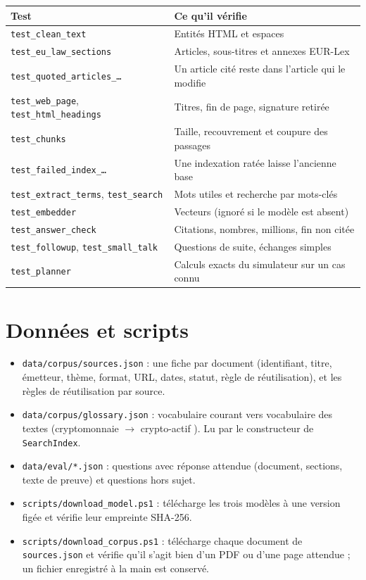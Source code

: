 \documentclass[11pt,a4paper]{article}
\newcommand{\fichier}[1]{\texttt{#1}}
\begin{document}
\begin{center}
\small
\begin{tabularx}{\linewidth}{@{}l X@{}}
\toprule
Test & Ce qu'il vérifie \\
\midrule
\texttt{test\_clean\_text} & Entités HTML et espaces \\
\texttt{test\_eu\_law\_sections} & Articles, sous-titres et annexes EUR-Lex \\
\texttt{test\_quoted\_articles\_\dots} & Un article cité reste dans l'article qui le modifie \\
\texttt{test\_web\_page}, \texttt{test\_html\_headings} & Titres, fin de page, signature retirée \\
\texttt{test\_chunks} & Taille, recouvrement et coupure des passages \\
\texttt{test\_failed\_index\_\dots} & Une indexation ratée laisse l'ancienne base \\
\texttt{test\_extract\_terms}, \texttt{test\_search} & Mots utiles et recherche par mots-clés \\
\texttt{test\_embedder} & Vecteurs (ignoré si le modèle est absent) \\
\texttt{test\_answer\_check} & Citations, nombres, millions, fin non citée \\
\texttt{test\_followup}, \texttt{test\_small\_talk} & Questions de suite, échanges simples \\
\texttt{test\_planner} & Calculs exacts du simulateur sur un cas connu \\
\bottomrule
\end{tabularx}
\end{center}

\section{Données et scripts}

\begin{itemize}
  \item \fichier{data/corpus/sources.json} : une fiche par document (identifiant, titre, émetteur, thème, format, URL, dates, statut, règle de réutilisation), et les règles de réutilisation par source.
  \item \fichier{data/corpus/glossary.json} : vocabulaire courant vers vocabulaire des textes (\og cryptomonnaie \fg{} \(\rightarrow\) \og crypto-actif \fg). Lu par le constructeur de \texttt{SearchIndex}.
  \item \fichier{data/eval/*.json} : questions avec réponse attendue (document, sections, texte de preuve) et questions hors sujet.
  \item \fichier{scripts/download\_model.ps1} : télécharge les trois modèles à une version figée et vérifie leur empreinte SHA-256.
  \item \fichier{scripts/download\_corpus.ps1} : télécharge chaque document de \fichier{sources.json} et vérifie qu'il s'agit bien d'un PDF ou d'une page attendue ; un fichier enregistré à la main est conservé.
\end{itemize}
\end{document}
